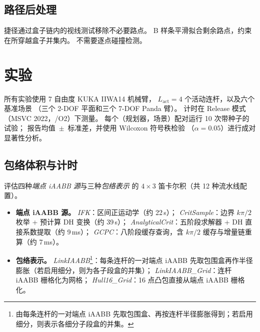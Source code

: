 \documentclass[journal]{IEEEtran}
\newcommand{\LinkIAABBDef}{由每条连杆的一对端点 iAABB 先取包围盒、再按连杆半径膨胀得到；若启用细分，则表示各细分子段盒的并集。}
\begin{document}
\subsection{路径后处理}\label{sec:post_process}

捷径通过盒子链内的视线测试移除不必要路点。
B 样条平滑拟合剩余路点，约束在所穿越盒子并集内。
不需要逐点碰撞检测。

\section{实验}\label{sec:experiments}


所有实验使用 7 自由度 KUKA IIWA14 机械臂，
$L_\text{act}{=}4$ 个活动连杆，以及六个基准场景
（三个 2-DOF 平面和三个 7-DOF Panda 臂）。
计时在 Release 模式（MSVC 2022，/O2）下测量。
每个（规划器，场景）配对运行 10 次带种子的试验；
报告均值~$\pm$~标准差，并使用 Wilcoxon 符号秩检验
（$\alpha{=}0.05$）进行成对显著性分析。

\subsection{包络体积与计时}\label{sec:exp_pipeline}

评估四种\emph{端点 iAABB 源}与三种\emph{包络表示}
的 $4{\times}3$ 笛卡尔积（共 12 种流水线配置）。

\begin{itemize}
  \item \textbf{端点 iAABB 源。}
    \emph{IFK}：区间正运动学（约 22\,\textmu s）；
    \emph{CritSample}：边界 $k\pi/2$ 枚举 + 预计算 DH 变换（约 39\,\textmu s）；
    \emph{AnalyticalCrit}：五阶段求解器 + DH 直接系数提取（约 9\,ms）；
    \emph{GCPC}：八阶段缓存查询，含 $k\pi/2$ 缓存与增量链重算（约 7\,ms）。
  \item \textbf{包络表示。}
    \emph{LinkIAABB}\footnote{\LinkIAABBDef}：每条连杆的一对端点 iAABB 先取包围盒再作半径膨胀（若启用细分，则为各子段盒的并集）；
    \emph{LinkIAABB\_Grid}：连杆 iAABB 栅格化为网格；
    \emph{Hull16\_Grid}：16 点凸包直接从端点 iAABB 栅格化。
\end{itemize}
\end{document}

